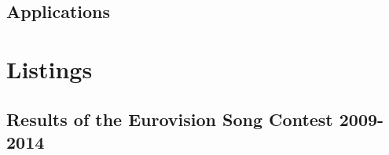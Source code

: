 \documentclass[a4paper,11pt]{report}
\begin{document}
\section{Applications}
\begin{appendices}
  \chapter{Listings} \label{appendixa}%









\begin{landscape}
  \chapter{Results of the Eurovision Song Contest 2009-2014}
  

\end{landscape}
\end{appendices}
\end{document}

